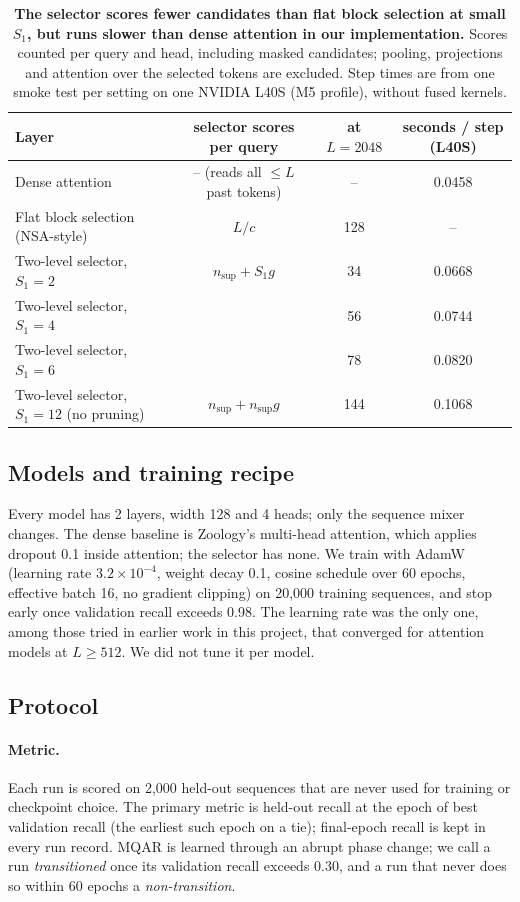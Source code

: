 \begin{table}[t]
\centering
\small
\begin{tabular}{lccc}
\toprule
Layer & selector scores per query & at $L{=}2048$ & seconds / step (L40S) \\
\midrule
Dense attention & -- (reads all $\le L$ past tokens) & -- & 0.0458 \\
Flat block selection (NSA-style) & $L/c$ & 128 & -- \\
Two-level selector, $S_1{=}2$ & $n_{\text{sup}} + S_1 g$ & 34 & 0.0668 \\
Two-level selector, $S_1{=}4$ & & 56 & 0.0744 \\
Two-level selector, $S_1{=}6$ & & 78 & 0.0820 \\
Two-level selector, $S_1{=}12$ (no pruning) & $n_{\text{sup}} + n_{\text{sup}} g$ & 144 & 0.1068 \\
\bottomrule
\end{tabular}
\caption{\textbf{The selector scores fewer candidates than flat block selection at small $S_1$, but runs slower
than dense attention in our implementation.} Scores counted per query and head, including masked candidates;
pooling, projections and attention over the selected tokens are excluded. Step times are from one smoke test per
setting on one NVIDIA L40S (M5 profile), without fused kernels.}
\label{tab:cost}
\end{table}

\subsection{Models and training recipe}

Every model has 2 layers, width 128 and 4 heads; only the sequence mixer changes. The dense baseline is Zoology's
multi-head attention, which applies dropout 0.1 inside attention; the selector has none. We train with AdamW
(learning rate $3.2\times10^{-4}$, weight decay 0.1, cosine schedule over 60 epochs, effective batch 16, no gradient
clipping) on 20{,}000 training sequences, and stop early once validation recall exceeds 0.98. The learning rate was
the only one, among those tried in earlier work in this project, that converged for attention models at
$L \ge 512$. We did not tune it per model.

\subsection{Protocol}

\paragraph{Metric.} Each run is scored on 2{,}000 held-out sequences that are never used for training or checkpoint
choice. The primary metric is held-out recall at the epoch of best validation recall (the earliest such epoch on a
tie); final-epoch recall is kept in every run record. MQAR is learned through an
abrupt phase change; we call a run \emph{transitioned} once its validation recall exceeds 0.30, and a run that never
does so within 60 epochs a \emph{non-transition}.

